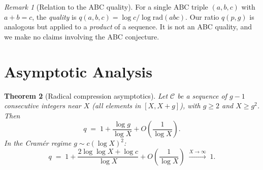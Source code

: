 \documentclass[11pt, a4paper]{article}
\newtheorem{theorem}{Theorem}[section]
\theoremstyle{definition}
\theoremstyle{remark}
\newtheorem{remark}[theorem]{Remark}
\newcommand{\rad}{\mathrm{rad}}
\begin{document}
\begin{remark}[Relation to the ABC quality]\label{rem:abc}
For a single ABC triple $(a,b,c)$ with $a + b = c$,
the \emph{quality} is
$q(a,b,c) = \log c / \log \rad(abc)$.
Our ratio $q(p,g)$ is analogous but applied to
a \emph{product} of a sequence.
It is not an ABC quality, and we make no claims
involving the ABC conjecture.
\end{remark}

\section{Asymptotic Analysis}\label{sec:asymptotics}

\begin{theorem}[Radical compression asymptotics]
\label{thm:main}
Let $\mathcal{C}$ be a sequence of $g - 1$ consecutive
integers near $X$ (all elements in $[X, X+g]$),
with $g \ge 2$ and $X \ge g^2$.
Then
\begin{equation}\label{eq:asymp}
    q \;=\; 1 + \frac{\log g}{\log X}
    + O\!\left(\frac{1}{\log X}\right).
\end{equation}
In the Cram\'er regime $g \sim c (\log X)^2$:
\begin{equation}\label{eq:cramer_regime}
    q \;=\; 1 + \frac{2\log\log X + \log c}{\log X}
    + O\!\left(\frac{1}{\log X}\right)
    \;\xrightarrow{X \to \infty}\; 1.
\end{equation}
\end{theorem}
\end{document}
